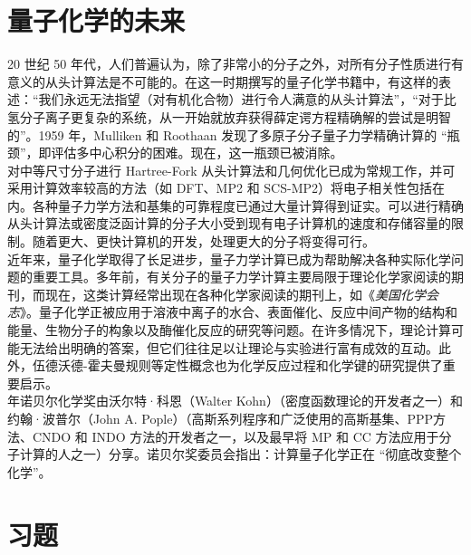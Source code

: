 \section{量子化学的未来}
	20 世纪 50 年代，人们普遍认为，除了非常小的分子之外，对所有分子性质进行有意义的从头计算法是不可能的。在这一时期撰写的量子化学书籍中，有这样的表述：“我们永远无法指望（对有机化合物）进行令人满意的从头计算法”，“对于比氢分子离子更复杂的系统，从一开始就放弃获得薛定谔方程精确解的尝试是明智的”。1959 年，Mulliken 和 Roothaan 发现了多原子分子量子力学精确计算的 “瓶颈”，即评估多中心积分的困难。现在，这一瓶颈已被消除。\\
	\indent 对中等尺寸分子进行 Hartree-Fork 从头计算法和几何优化已成为常规工作，并可采用计算效率较高的方法（如 DFT、MP2 和 SCS-MP2）将电子相关性包括在内。各种量子力学方法和基集的可靠程度已通过大量计算得到证实。可以进行精确从头计算法或密度泛函计算的分子大小受到现有电子计算机的速度和存储容量的限制。随着更大、更快计算机的开发，处理更大的分子将变得可行。\\
	\indent 近年来，量子化学取得了长足进步，量子力学计算已成为帮助解决各种实际化学问 题的重要工具。多年前，有关分子的量子力学计算主要局限于理论化学家阅读的期刊，而现在，这类计算经常出现在各种化学家阅读的期刊上，如《\textit{美国化学会志}》。量子化学正被应用于溶液中离子的水合、表面催化、反应中间产物的结构和能量、生物分子的构象以及酶催化反应的研究等问题。在许多情况下，理论计算可能无法给出明确的答案，但它们往往足以让理论与实验进行富有成效的互动。此外，伍德沃德-霍夫曼规则等定性概念也为化学反应过程和化学键的研究提供了重要启示。\\
	 年诺贝尔化学奖由沃尔特·科恩（Walter Kohn）（密度函数理论的开发者之一）和约翰·波普尔（John A. Pople）（高斯系列程序和广泛使用的高斯基集、PPP方法、CNDO 和 INDO 方法的开发者之一，以及最早将 MP 和 CC 方法应用于分子计算的人之一）分享。诺贝尔奖委员会指出：计算量子化学正在 “彻底改变整个化学”。

\section*{习题}

